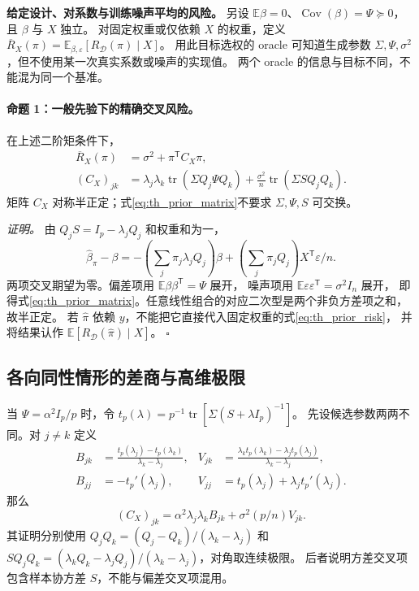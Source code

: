 \documentclass[UTF8,fontset=fandol,11pt,a4paper]{ctexart}
\begin{document}
\textbf{给定设计、对系数与训练噪声平均的风险。}
另设 $\mathbb E\beta=0$、$\operatorname{Cov}(\beta)=\Psi\succeq0$，且 $\beta$ 与 $X$ 独立。
对固定权重或仅依赖 $X$ 的权重，定义
$\overline R_X(\pi)=\mathbb E_{\beta,\varepsilon}[R_{\mathcal D}(\pi)\mid X]$。
用此目标选权的 oracle 可知道生成参数 $\Sigma,\Psi,\sigma^2$，但不使用某一次真实系数或噪声的实现值。
两个 oracle 的信息与目标不同，不能混为同一个基准。

\paragraph{命题 1：一般先验下的精确交叉风险。}
在上述二阶矩条件下，
\begin{align}
 \overline R_X(\pi)&=\sigma^2+\pi^{\mathsf T}C_X\pi,\label{eq:th_prior_risk}\\
 (C_X)_{jk}
 &=\lambda_j\lambda_k\operatorname{tr}(\Sigma Q_j\Psi Q_k)
   +\frac{\sigma^2}{n}\operatorname{tr}(\Sigma SQ_jQ_k).
 \label{eq:th_prior_matrix}
\end{align}
矩阵 $C_X$ 对称半正定；式\eqref{eq:th_prior_matrix}不要求 $\Sigma,\Psi,S$ 可交换。

\textit{证明。}
由 $Q_jS=I_p-\lambda_jQ_j$ 和权重和为一，
\begin{equation}\label{eq:th_error_decomp}
 \widehat\beta_\pi-\beta
 =-\left(\sum_j\pi_j\lambda_jQ_j\right)\beta
  +\left(\sum_j\pi_jQ_j\right)X^{\mathsf T}\varepsilon/n.
\end{equation}
两项交叉期望为零。偏差项用 $\mathbb E\beta\beta^{\mathsf T}=\Psi$ 展开，
噪声项用 $\mathbb E\varepsilon\varepsilon^{\mathsf T}=\sigma^2I_n$ 展开，
即得式\eqref{eq:th_prior_matrix}。任意线性组合的对应二次型是两个非负方差项之和，故半正定。
若 $\widehat\pi$ 依赖 $y$，不能把它直接代入固定权重的式\eqref{eq:th_prior_risk}，
并将结果认作 $\mathbb E[R_{\mathcal D}(\widehat\pi)\mid X]$。
\hfill$\square$

\subsection{各向同性情形的差商与高维极限}
当 $\Psi=\alpha^2I_p/p$ 时，令 $t_p(\lambda)=p^{-1}\operatorname{tr}[\Sigma(S+\lambda I_p)^{-1}]$。
先设候选参数两两不同。对 $j\ne k$ 定义
\begin{align}
 B_{jk}&=\frac{t_p(\lambda_j)-t_p(\lambda_k)}{\lambda_k-\lambda_j},&
 V_{jk}&=\frac{\lambda_kt_p(\lambda_k)-\lambda_jt_p(\lambda_j)}{\lambda_k-\lambda_j},\label{eq:th_divided}\\
 B_{jj}&=-t_p'(\lambda_j),&
 V_{jj}&=t_p(\lambda_j)+\lambda_jt_p'(\lambda_j).
 \label{eq:th_diag}
\end{align}
那么
\begin{equation}\label{eq:th_isotropic_matrix}
 (C_X)_{jk}=\alpha^2\lambda_j\lambda_kB_{jk}+\sigma^2(p/n)V_{jk}.
\end{equation}
其证明分别使用
$Q_jQ_k=(Q_j-Q_k)/(\lambda_k-\lambda_j)$ 和
$SQ_jQ_k=(\lambda_kQ_k-\lambda_jQ_j)/(\lambda_k-\lambda_j)$，对角取连续极限。
后者说明方差交叉项包含样本协方差 $S$，不能与偏差交叉项混用。
\end{document}
